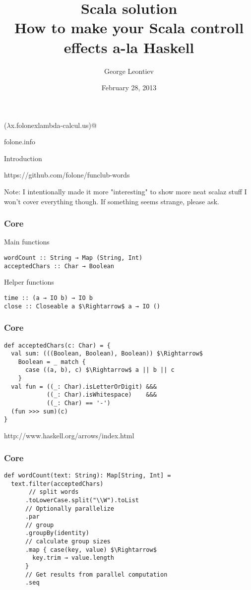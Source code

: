 \documentclass{beamer}
\title[Scala solution]{Scala solution\\How to make your Scala controll effects a-la Haskell}
\author{George Leontiev}
\institute{deltamethod GmbH}
\date{February 28, 2013}
\begin{document}
\begin{frame}
\titlepage
\centerline{($\lambda$x.folonexlambda-calcul.us)@}
\centerline{folone.info}
\end{frame}


\begin{frame}{Introduction}
  \Large \centerline{https://github.com/folone/funclub-words} \normalsize
  Note: I intentionally made it more "interesting" to show more neat scalaz stuff\newline
  I won't cover everything though. If something seems strange, please ask.
\end{frame}

\begin{frame}[fragile]
\frametitle{Core}
Main functions
\begin{lstlisting}[mathescape]
wordCount :: String → Map (String, Int)
acceptedChars :: Char → Boolean
\end{lstlisting}
Helper functions
\begin{lstlisting}[mathescape]
time :: (a → IO b) → IO b
close :: Closeable a $\Rightarrow$ a → IO ()
\end{lstlisting}
\end{frame}

\begin{frame}[fragile]
\frametitle{Core}
\begin{lstlisting}[mathescape]
def acceptedChars(c: Char) = {
  val sum: (((Boolean, Boolean), Boolean)) $\Rightarrow$
    Boolean = _ match {
      case ((a, b), c) $\Rightarrow$ a || b || c
    }
  val fun = ((_: Char).isLetterOrDigit) &&&
            ((_: Char).isWhitespace)    &&&
            ((_: Char) == '-')
  (fun >>> sum)(c)
}
\end{lstlisting}
http://www.haskell.org/arrows/index.html
\end{frame}

\begin{frame}[fragile]
\frametitle{Core}
\begin{lstlisting}[mathescape]
def wordCount(text: String): Map[String, Int] =
  text.filter(acceptedChars)
       // split words
      .toLowerCase.split("\\W").toList
      // Optionally parallelize
      .par
      // group
      .groupBy(identity)
      // calculate group sizes
      .map { case(key, value) $\Rightarrow$
        key.trim → value.length
      }
      // Get results from parallel computation
      .seq
\end{lstlisting}
\end{frame}
\end{document}
